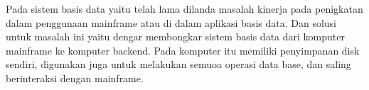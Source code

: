 Pada sistem basis data yaitu telah lama dilanda masalah kinerja pada penigkatan dalam penggunaan mainframe atau di dalam aplikasi basis data. Dan solusi untuk masalah ini yaitu dengar membongkar sistem basis data dari komputer mainframe ke komputer backend. Pada komputer itu memiliki penyimpanan disk sendiri, digunakan juga untuk melakukan semuoa operasi data base, dan saling berinteraksi dengan mainframe.






		

